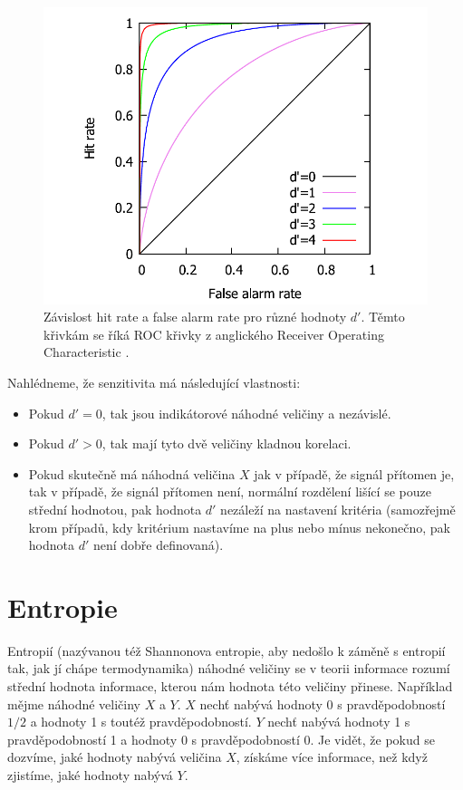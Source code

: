 \begin{figure}[h!]
  \includegraphics[width=.8\linewidth]{graphs/ROC.pdf}
  \centering
\caption{Závislost hit rate a false alarm rate pro různé hodnoty $d'$. Těmto křivkám se říká ROC křivky z anglického Receiver Operating Characteristic \citep{SwetsSDT,GreenSDT}.} 
\label{obr:dprime} 
\end{figure}


Nahlédneme, že senzitivita má následující vlastnosti:
\begin{itemize}
\item Pokud $d' = 0$, tak jsou indikátorové náhodné veličiny  a  nezávislé.
\item Pokud $d' > 0$, tak mají tyto dvě veličiny kladnou korelaci.
\item Pokud skutečně má náhodná veličina $X$ jak v případě, že signál přítomen je, tak v případě, že signál přítomen není, normální rozdělení lišící se pouze střední hodnotou, pak hodnota $d'$ nezáleží na nastavení kritéria (samozřejmě krom případů, kdy kritérium nastavíme na plus nebo mínus nekonečno, pak hodnota $d'$ není dobře definovaná).
\end{itemize}

\section{Entropie}

Entropií (nazývanou též Shannonova entropie, aby nedošlo k záměně s entropií
tak, jak jí chápe termodynamika) náhodné veličiny se v teorii informace rozumí
střední hodnota informace, kterou nám hodnota této veličiny přinese. Například
mějme náhodné veličiny $X$ a $Y$. $X$ nechť nabývá hodnoty 0 s pravděpodobností
$1/2$ a hodnoty 1 s toutéž pravděpodobností. $Y$ nechť nabývá hodnoty 1 s
pravděpodobností 1 a hodnoty 0 s pravděpodobností 0. Je vidět, že pokud se
dozvíme, jaké hodnoty nabývá veličina $X$, získáme více informace, než když
zjistíme, jaké hodnoty nabývá $Y$.
\def\H{\operatorname{H}}


